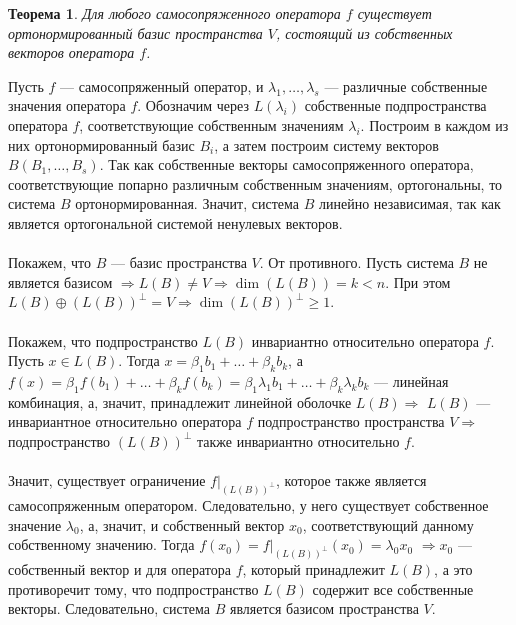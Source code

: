 \newtheorem*{th14_6_2}{Теорема}\begin{th14_6_2}Для любого самосопряженного оператора $f$ существует ортонормированный базис пространства $V$, состоящий из собственных векторов оператора $f$.
\end{th14_6_2}\begin{Proof}
	Пусть $f$ --- самосопряженный оператор, и $\lambda_1, \dots, \lambda_s$ --- различные собственные значения оператора $f$. Обозначим через $L(\lambda_i)$ собственные подпространства оператора $f$, соответствующие собственным значениям $\lambda_i$. Построим в каждом из них ортонормированный базис $B_i$, а затем построим систему векторов $B(B_1, \dots, B_s)$. Так как собственные векторы самосопряженного оператора, соответствующие попарно различным собственным значениям, ортогональны, то система $B$ ортонормированная. Значит, система $B$ линейно независимая, так как является ортогональной системой ненулевых векторов. \\\\Покажем, что $B$ --- базис пространства $V$. От противного. Пусть система $B$ не является базисом $\Rightarrow L(B) \ne V \Rightarrow \dim (L(B)) = k < n$. При этом $L(B) \oplus (L(B))^\perp = V \Rightarrow \dim (L(B))^\perp\geqslant 1$.\\\\
	Покажем, что подпространство $L(B)$ инвариантно относительно оператора $f$. Пусть $x \in L(B)$. Тогда $x = \beta_1b_1 + \ldots + \beta_kb_k$, а $f(x) = \beta_1f(b_1) + \ldots + \beta_kf(b_k) = \beta_1\lambda_1b_1 + \ldots + \beta_k\lambda_kb_k$ --- линейная комбинация, а, значит, принадлежит линейной оболочке $L(B)\Rightarrow$ $L(B)$ --- инвариантное относительно оператора $f$ подпространство пространства $V \Rightarrow$ подпространство $(L(B))^\perp$ также инвариантно относительно $f$.\\\\		
	Значит, существует ограничение $f|_{(L(B))^\perp}$, которое также является самосопряженным оператором. Следовательно, у него существует собственное значение $\lambda_0$, а, значит, и собственный вектор $x_0$, соответствующий данному собственному значению. Тогда $f(x_0) = f|_{(L(B))^\perp}(x_0) = \lambda_0x_0$ $\Rightarrow x_0 $ --- собственный вектор и для оператора $f$, который принадлежит $L(B)$, а это противоречит тому, что подпространство $L(B)$ содержит все собственные векторы. Следовательно, система $B$ является базисом пространства $V$.
\end{Proof}







